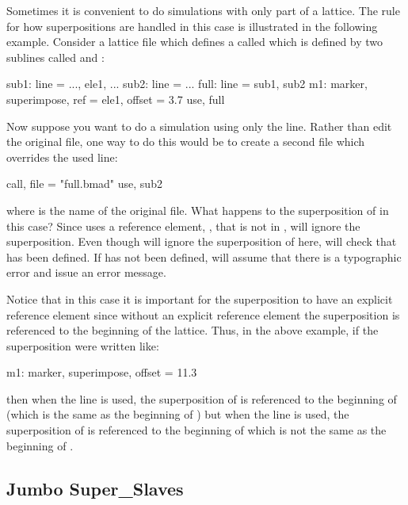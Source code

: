 Sometimes it is convenient to do simulations with only part of a lattice. The rule for how
superpositions are handled in this case is illustrated in the following example. Consider a lattice
file which defines a  called  which is defined by two sublines called 
and :
\begin{example}
  sub1: line = {..., ele1, ...}
  sub2: line = {...}
  full: line = {sub1, sub2}
  m1: marker, superimpose, ref = ele1, offset = 3.7
  use, full
\end{example}
Now suppose you want to do a simulation using only the  line. Rather than edit the original
file, one way to do this would be to create a second file which overrides the used line:
\begin{example}
  call, file = "full.bmad"
  use, sub2
\end{example}
where  is the name of the original file. What happens to the superposition of 
in this case? Since  uses a reference element, , that is not in , \bmad
will ignore the superposition. Even though \bmad will ignore the superposition of  here,
\bmad will check that  has been defined. If  has not been defined, \bmad will
assume that there is a typographic error and issue an error message.

Notice that in this case it is important for the superposition to have an explicit reference element
since without an explicit reference element the superposition is referenced to the beginning of the
lattice. Thus, in the above example, if the superposition were written like:
\begin{example}
  m1: marker, superimpose, offset = 11.3
\end{example}
then when the  line is used, the superposition of  is referenced to the beginning of
 (which is the same as the beginning of ) but when the  line is used, the
superposition of  is referenced to the beginning of  which is not the same as the
beginning of .

\subsection{Jumbo Super_Slaves}
\label{s:jumbo.slave}

